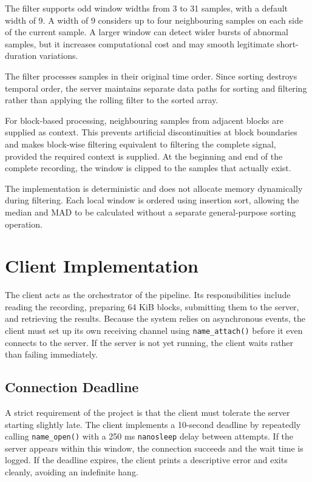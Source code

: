 \documentclass[12pt,a4paper,oneside]{report}
\begin{document}
The filter supports odd window widths from 3 to 31 samples, with a default width of 9. A width of 9 considers up to four neighbouring samples on each side of the current sample. A larger window can detect wider bursts of abnormal samples, but it increases computational cost and may smooth legitimate short-duration variations.

The filter processes samples in their original time order. Since sorting destroys temporal order, the server maintains separate data paths for sorting and filtering rather than applying the rolling filter to the sorted array.

For block-based processing, neighbouring samples from adjacent blocks are supplied as context. This prevents artificial discontinuities at block boundaries and makes block-wise filtering equivalent to filtering the complete signal, provided the required context is supplied. At the beginning and end of the complete recording, the window is clipped to the samples that actually exist.

The implementation is deterministic and does not allocate memory dynamically during filtering. Each local window is ordered using insertion sort, allowing the median and MAD to be calculated without a separate general-purpose sorting operation.

\section{Client Implementation}
\label{sec:client}

The client acts as the orchestrator of the pipeline. Its responsibilities include reading the recording, preparing 64 KiB blocks, submitting them to the server, and retrieving the results. Because the system relies on asynchronous events, the client must set up its own receiving channel using \texttt{name\_attach()} before it even connects to the server. If the server is not yet running, the client waits rather than failing immediately.

\subsection{Connection Deadline}
A strict requirement of the project is that the client must tolerate the server starting slightly late. The client implements a 10-second deadline by repeatedly calling \texttt{name\_open()} with a 250 ms \texttt{nanosleep} delay between attempts. If the server appears within this window, the connection succeeds and the wait time is logged. If the deadline expires, the client prints a descriptive error and exits cleanly, avoiding an indefinite hang.
\end{document}
